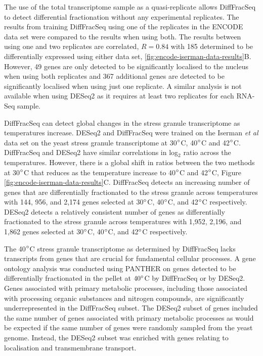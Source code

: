 \documentclass[../main.tex]{subfiles}
\begin{document}
The use of the total transcriptome sample as a quasi-replicate allows DiffFracSeq to detect differential fractionation without any experimental replicates.
The results from training DiffFracSeq using one of the replicates in the ENCODE data set were compared to the results when using both. 
The results between using one and two replicates are correlated, $R = 0.84$ with 185 determined to be differentially expressed using either data set, \ref{fig:encode-iserman-data-results}B.
However, 49 genes are only detected to be significantly localised to the nucleus when using both replicates and 367 additional genes are detected to be significantly localised when using just one replicate.
A similar analysis is not available when using DESeq2 as it requires at least two replicates for each RNA-Seq sample.

DiffFracSeq can detect global changes in the stress granule transcriptome as temperatures increase.
DESeq2 and DiffFracSeq were trained on the Iserman \textit{et al} data set on the yeast stress granule transcriptome at 30$\degree$C, 40$\degree$C and 42$\degree$C. 
DiffFracSeq and DESeq2 have similar correlations in log$_2$ ratio across the temperatures. However, there is a global shift in ratios between the two methods at 30$\degree$C that reduces as the temperature increase to 40$\degree$C and 42$\degree$C, Figure \ref{fig:encode-iserman-data-results}C.
DiffFracSeq detects an increasing number of genes that are differentially fractionated to the stress granule across temperatures with 144, 956, and 2,174 genes selected at 30$\degree$C, 40$\degree$C, and 42$\degree$C respectively.
DESeq2 detects a relatively consistent number of genes as differentially fractionated to the stress granule across temperatures with 1,952, 2,196, and 1,862 genes selected at 30$\degree$C, 40$\degree$C, and 42$\degree$C respectively.

The 40$\degree$C stress granule transcriptome as determined by DiffFracSeq lacks transcripts from genes that are crucial for fundamental cellular processes.
A gene ontology analysis was conducted using PANTHER on genes detected to be differentially fractionated in the pellet at $40\degree$C by DiffFracSeq or by DESeq2.
Genes associated with primary metabolic processes, including those associated with processing organic substances and nitrogen compounds, are significantly underrepresented in the DiffFracSeq subset.
The DESeq2 subset of genes included the same number of genes associated with primary metabolic processes as would be expected if the same number of genes were randomly sampled from the yeast genome.
Instead, the DESeq2 subset was enriched with genes relating to localisation and transmembrane transport. 
\end{document}
